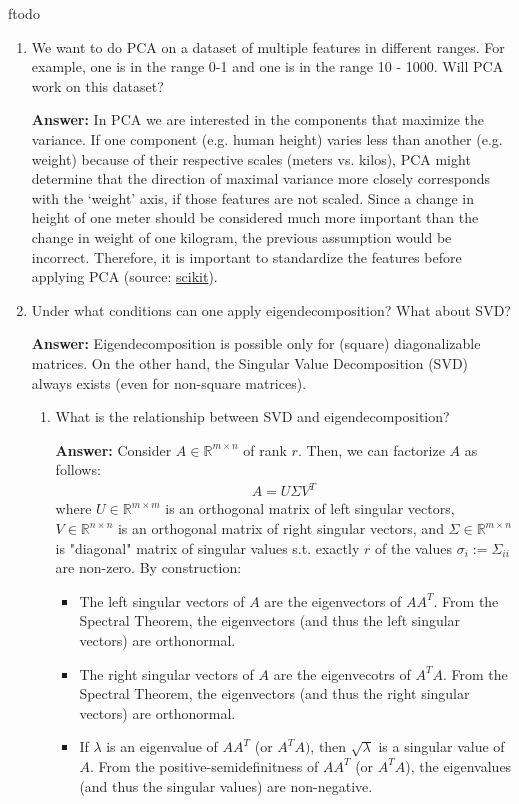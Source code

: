 ƒtodo\documentclass{article}
\newenvironment{QandA}{\begin{enumerate}[label=\arabic*.]}{\end{enumerate}}
\newenvironment{InnerQandA}{\begin{enumerate}[label=\roman*.]}{\end{enumerate}}
\newenvironment{answer}{\par\normalfont \textbf{Answer:}}{}
\newcommand{\R}{\mathbb{R}}
\begin{document}
\begin{QandA}
    \item We want to do PCA on a dataset of multiple features in different ranges. For example, one is in the range 0-1 and one is in the range 10 - 1000. Will PCA work on this dataset?
    \begin{answer}
         In PCA we are interested in the components that maximize the variance. If one component (e.g. human height) varies less than another (e.g. weight) because of their respective scales (meters vs. kilos), PCA might determine that the direction of maximal variance more closely corresponds with the ‘weight’ axis, if those features are not scaled. Since a change in height of one meter should be considered much more important than the change in weight of one kilogram, the previous assumption would be incorrect. Therefore, it is important to standardize the features before applying PCA (source: \href{https://scikit-learn.org/stable/auto_examples/preprocessing/plot_scaling_importance.html}{scikit}).
    \end{answer}

    \item Under what conditions can one apply eigendecomposition? What about SVD?
    \begin{answer}
        Eigendecomposition is possible only for (square) diagonalizable matrices. On the other hand, the Singular Value Decomposition (SVD) always exists (even for non-square matrices).
    \end{answer}
    \begin{InnerQandA}
        \item What is the relationship between SVD and eigendecomposition?
        \begin{answer}
            Consider $A \in \R^{m \times n}$ of rank $r$. Then, we can factorize $A$ as follows:
            \begin{align*}
                A = U \Sigma V^T
            \end{align*}
            where $U \in \R^{m \times m}$ is an orthogonal matrix of left singular vectors, $V \in \R^{n \times n}$ is an orthogonal matrix of right singular vectors, and $\Sigma \in \R^{m \times n}$ is "diagonal" matrix of singular values s.t. exactly $r$ of the values $\sigma_i := \Sigma_{ii}$ are non-zero. By construction:
            \begin{itemize}
                \item The left singular vectors of $A$ are the eigenvectors of $AA^T$. From the Spectral Theorem, the eigenvectors (and thus the left singular vectors) are orthonormal.
                \item The right singular vectors of $A$ are the eigenvecotrs of $A^TA$. From the Spectral Theorem, the eigenvectors (and thus the right singular vectors) are orthonormal.
                \item If $\lambda$ is an eigenvalue of $AA^T$ (or $A^TA)$, then $\sqrt{\lambda}$ is a singular value of $A$. From the positive-semidefinitness of $AA^T$ (or $A^TA$), the eigenvalues (and thus the singular values) are non-negative.
            \end{itemize}
        \end{answer}


\end{InnerQandA}
\end{QandA}
\end{document}
